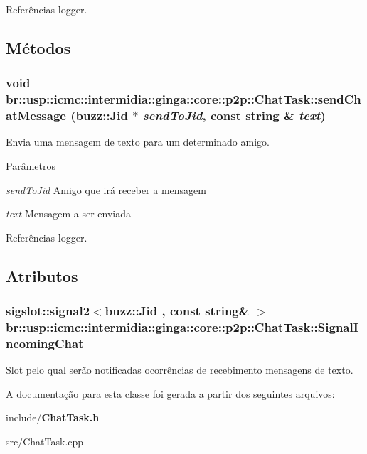 Referências logger.



\subsection{Métodos}
\subsubsection[{sendChatMessage}]{\setlength{\rightskip}{0pt plus 5cm}void br::usp::icmc::intermidia::ginga::core::p2p::ChatTask::sendChatMessage (buzz::Jid $\ast$ {\em sendToJid}, \/  const string \& {\em text})}\label{classbr_1_1usp_1_1icmc_1_1intermidia_1_1ginga_1_1core_1_1p2p_1_1ChatTask_a08f15eb0a25da642c5444ebff761e190}
Envia uma mensagem de texto para um determinado amigo.


\begin{DoxyParams}{Parâmetros}
\item[{\em sendToJid}]Amigo que irá receber a mensagem \item[{\em text}]Mensagem a ser enviada \end{DoxyParams}


Referências logger.



\subsection{Atributos}
\subsubsection[{SignalIncomingChat}]{\setlength{\rightskip}{0pt plus 5cm}sigslot::signal2$<$buzz::Jid , const string\& $>$ {\bf br::usp::icmc::intermidia::ginga::core::p2p::ChatTask::SignalIncomingChat}}\label{classbr_1_1usp_1_1icmc_1_1intermidia_1_1ginga_1_1core_1_1p2p_1_1ChatTask_aadea820b55f7ff1ed5a75ea416369c30}
Slot pelo qual serão notificadas ocorrências de recebimento mensagens de texto. 

A documentação para esta classe foi gerada a partir dos seguintes arquivos:\begin{DoxyCompactItemize}
\item 
include/{\bf ChatTask.h}\item 
src/ChatTask.cpp\end{DoxyCompactItemize}
